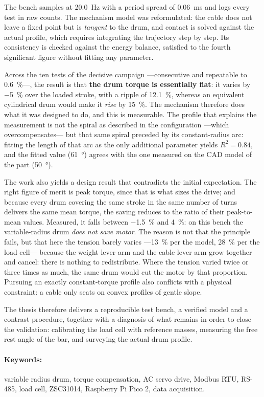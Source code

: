 The bench samples at \SI{20.0}{\hertz} with a period spread of \SI{0.06}{\milli\second} and logs
every test in raw counts. The mechanism model was reformulated: the cable does not leave a fixed
point but is \emph{tangent} to the drum, and contact is solved against the actual profile, which
requires integrating the trajectory step by step. Its consistency is checked against the energy
balance, satisfied to the fourth significant figure without fitting any parameter.

Across the ten tests of the decisive campaign ---consecutive and repeatable to \SI{0.6}{\percent}---,
the result is that \textbf{the drum torque is essentially flat}: it varies by \SI{-5}{\percent} over
the loaded stroke, with a ripple of \SI{12.1}{\percent}, whereas an equivalent cylindrical drum would make it \emph{rise} by
\SI{15}{\percent}. The mechanism therefore does what it was designed to do, and this is measurable.
The profile that explains the measurement is not the spiral as described in the configuration
---which overcompensates--- but that same spiral preceded by its constant-radius arc: fitting the
length of that arc as the only additional parameter yields $R^2 = 0.84$, and the fitted value
(\SI{61}{\degree}) agrees with the one measured on the CAD model of the part (\SI{50}{\degree}).

The work also yields a design result that contradicts the initial expectation. The right figure of
merit is peak torque, since that is what sizes the drive; and because every drum covering the same
stroke in the same number of turns delivers the same mean torque, the saving reduces to the ratio of
their peak-to-mean values. Measured, it falls between \SI{-1.5}{\percent} and \SI{+4}{\percent}: on
this bench the variable-radius drum \emph{does not save motor}. The reason is not that the principle
fails, but that here the tension barely varies ---\SI{13}{\percent} per the model,
\SI{28}{\percent} per the load cell--- because the weight lever arm and the cable lever arm grow
together and cancel: there is nothing to redistribute. Where the tension varied twice or three times
as much, the same drum would cut the motor by that proportion. Pursuing an exactly constant-torque
profile also conflicts with a physical constraint: a cable only seats on convex profiles of gentle
slope.

The thesis therefore delivers a reproducible test bench, a verified model and a contrast procedure,
together with a diagnosis of what remains in order to close the validation: calibrating the load cell
with reference masses, measuring the free rest angle of the bar, and surveying the actual drum
profile.

\paragraph{Keywords:} variable radius drum, torque compensation, AC servo drive, Modbus RTU, RS-485,
load cell, ZSC31014, Raspberry Pi Pico 2, data acquisition.
